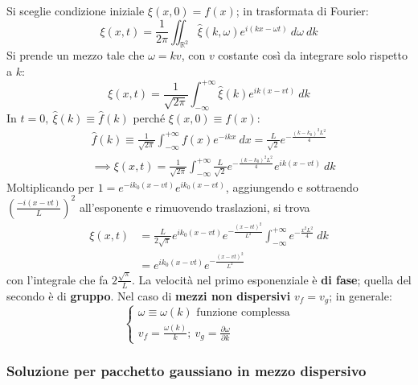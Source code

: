 \documentclass[a4paper]{scrartcl}
\numberwithin{equation}{subsection}
\theoremstyle{style1}
\begin{document}
Si sceglie condizione iniziale $\xi (x,0) = f(x)$; in trasformata di Fourier:
\[
\xi (x,t) = \frac{1}{2\pi} \iint_{\mathbb{R}^2} \hat{\xi }(k,\omega) e^{i(kx-\omega t)}\ d\omega\ dk
\] 
Si prende un mezzo tale che $\omega = k v$, con $v $ costante cos\`i da integrare solo rispetto a $k$:
\[
\xi (x,t) = \frac{1}{\sqrt{2\pi} } \int_{-\infty} ^{+\infty} \hat{\xi }(k) e^{ik(x-vt)} \ dk
\] 
In $t=0, \ \hat{\xi }(k) \equiv \hat{f}(k)$ perch\'e $\xi (x,0)\equiv f(x)$:
\[
	\begin{split}
		&\hat{f}(k)\equiv \frac{1}{\sqrt{2\pi} }\int_{-\infty }^{+\infty} f(x) e^{-ikx} \ dx = \frac{L}{\sqrt{2} }e^{-\frac{(k-k_0)^2 L^2}{4}} \\
		&\implies \xi (x,t) = \frac{1}{\sqrt{2\pi} }\int_{-\infty} ^{+\infty} \frac{L}{\sqrt{2} } e^{- \frac{(k-k_0)^2 L^2}{4}} e^{ik(x-vt)} \ dk
	\end{split}
\] 
Moltiplicando per $1=e^{-ik_0(x-vt)} e^{ik_0(x-vt)} $, aggiungendo e sottraendo $\left(\frac{-i(x-vt)}{L}\right) ^2$ all'esponente e rimuovendo traslazioni, si trova
\begin{equation}
	\begin{split}
		\xi (x,t) &= \frac{L}{2\sqrt{\pi} }e^{ik_0(x-vt) } e^{-\frac{(x-vt)^2}{L^2}} \int_{-\infty} ^{+\infty} e^{- \frac{x^2L^2}{4}} \ dk\\
			  &=e^{ik_0(x-vt)} e^{- \frac{(x-vt)^2}{L^2}} 
	\end{split}
\end{equation}
con l'integrale che fa $2 \frac{\sqrt{\pi} }{L}$. La velocit\`a nel primo esponenziale \`e \textbf{di fase}; quella del secondo \`e di \textbf{gruppo}. Nel caso di \textbf{mezzi non dispersivi} $v_f = v_g$; in generale:
\begin{equation}
	\begin{cases}
		\omega\equiv \omega (k) \text{ funzione complessa}\\
		v_f = \frac{\omega(k)}{k}; \ v_g = \frac{\partial \omega}{\partial k} 
	\end{cases}
\end{equation}
\subsubsection{Soluzione per pacchetto gaussiano in mezzo dispersivo}
\end{document}
